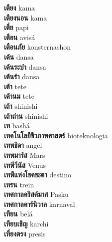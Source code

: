 \textbf{ เตียง  } kama \\
\textbf{ เตียงนอน  } kama \\
\textbf{ เตี่ย  } papi \\
\textbf{ เตือน  } avisá \\
\textbf{ เตือนภัย  } konsternashon \\
\textbf{ เต้น  } dansa \\
\textbf{ เต้นระบำ  } dansa \\
\textbf{ เต้นรำ  } dansa \\
\textbf{ เต้า  } tete \\
\textbf{ เต้านม  } tete \\
\textbf{ เถ้า  } shinishi \\
\textbf{ เถ้าถ่าน  } shinishi \\
\textbf{ เท  } bashá \\
\textbf{ เทคโนโลยีชีวภาพศาสตร์  } bioteknologia \\
\textbf{ เทพธิดา  } angel \\
\textbf{ เทพมาร์ส  } Mars \\
\textbf{ เทพีวีนัส  } Venus \\
\textbf{ เทพีแห่งโชคชะตา  } destino \\
\textbf{ เทรน  } trein \\
\textbf{ เทศกาลคริสต์มาส  } Pasku \\
\textbf{ เทศกาลคาร์นิวาล  } karnaval \\
\textbf{ เทียน  } belá \\
\textbf{ เทียบเชิญ  } karchi \\
\textbf{ เที่ยงตรง  } presis \\
